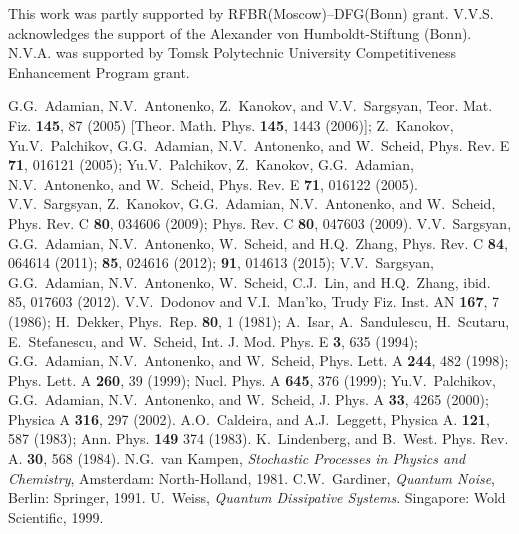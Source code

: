 \documentclass[preprint,review,12pt]{elsarticle}
\begin{document}
This work was partly supported by RFBR(Moscow)--DFG(Bonn) grant. V.V.S. acknowledges the support
of the Alexander von Humboldt-Stiftung (Bonn). N.V.A. was supported by Tomsk Polytechnic University
Competitiveness Enhancement Program grant.




\begin{thebibliography}{99}
       G.G.~Adamian, N.V.~Antonenko, Z.~Kanokov, and V.V.~Sargsyan, Teor. Mat. Fiz. {\bf 145}, 87 (2005)
                      [Theor. Math. Phys. {\bf 145}, 1443 (2006)];
                      Z.~Kanokov, Yu.V.~Palchikov,  G.G.~Adamian, N.V.~Antonenko, and W.~Scheid, Phys. Rev. E {\bf 71}, 016121 (2005);
                      Yu.V.~Palchikov, Z.~Kanokov,  G.G.~Adamian, N.V.~Antonenko, and W.~Scheid, Phys. Rev. E {\bf 71}, 016122 (2005).
      V.V.~Sargsyan, Z.~Kanokov, G.G.~Adamian, N.V.~Antonenko, and W.~Scheid,
                      Phys. Rev. C {\bf 80}, 034606 (2009); Phys. Rev. C {\bf 80}, 047603 (2009).
  V.V.~Sargsyan, G.G.~Adamian, N.V.~Antonenko, W.~Scheid, and H.Q.~Zhang, Phys. Rev. C {\bf 84},
                    064614 (2011); {\bf 85}, 024616 (2012); {\bf 91}, 014613 (2015);
                    V.V.~Sargsyan, G.G.~Adamian, N.V.~Antonenko, W.~Scheid, C.J.~Lin, and H.Q.~Zhang, ibid. 85, 017603 (2012).
 V.V.~Dodonov and V.I.~Man'ko, Trudy Fiz. Inst. AN {\bf 167}, 7 (1986);  H.~Dekker, Phys.~Rep. {\bf 80}, 1 (1981);
                      A.~Isar, A.~Sandulescu, H.~Scutaru, E.~Stefanescu, and W.~Scheid, Int. J. Mod. Phys. E {\bf 3}, 635 (1994);
                      G.G.~Adamian, N.V.~Antonenko, and  W.~Scheid, Phys. Lett. A {\bf 244},  482 (1998);
                      Phys. Lett. A {\bf 260}, 39 (1999); Nucl. Phys. A {\bf 645}, 376 (1999);
                      Yu.V.~Palchikov, G.G.~Adamian, N.V.~Antonenko, and  W.~Scheid, J. Phys. A {\bf 33}, 4265 (2000);
                      Physica A {\bf 316}, 297 (2002).
     A.O.~Caldeira, and A.J.~Leggett, Physica A. {\bf 121}, 587 (1983); Ann. Phys. {\bf 149} 374 (1983).
     K.~Lindenberg,  and B.~West. Phys. Rev. A. {\bf 30}, 568 (1984).
      N.G.~van Kampen, {\it Stochastic Processes in Physics and Chemistry}, Amsterdam: North-Holland, 1981.
    C.W.~Gardiner, {\it Quantum Noise}, Berlin: Springer, 1991.
       U.~Weiss, {\it Quantum Dissipative Systems}. Singapore: Wold Scientific, 1999.

\end{thebibliography}
\end{document}
